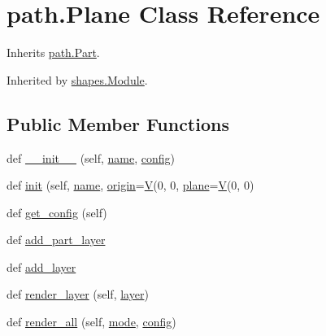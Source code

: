 \hypertarget{classpath_1_1_plane}{}\section{path.\+Plane Class Reference}
\label{classpath_1_1_plane}


Inherits \hyperlink{classpath_1_1_part}{path.\+Part}.



Inherited by \hyperlink{classshapes_1_1_module}{shapes.\+Module}.

\subsection*{Public Member Functions}
\begin{DoxyCompactItemize}
\item 
def \hyperlink{classpath_1_1_plane_a8c7b599791d3c3452ee585a386631e26}{\+\_\+\+\_\+init\+\_\+\+\_\+} (self, \hyperlink{classpath_1_1_plane_a83242faa5f70bd6aa867c977d4f4a6c1}{name}, \hyperlink{classpath_1_1_plane_a9c3565a0c72c585ffd3d9305d9e59b64}{config})
\item 
def \hyperlink{classpath_1_1_plane_adf18d22bc49d69c89b576a79fdba4db8}{init} (self, \hyperlink{classpath_1_1_plane_a83242faa5f70bd6aa867c977d4f4a6c1}{name}, \hyperlink{classpath_1_1_plane_a07fffbf7ef837b7f8a0d9e2a69161e1b}{origin}=\hyperlink{namespacepath_a1d2c06ebecd0a735e9c87e8b97ee9d1a}{V}(0, 0, \hyperlink{classpath_1_1_plane_aa10bd618cd80d3ee1fe348a94b173736}{plane}=\hyperlink{namespacepath_a1d2c06ebecd0a735e9c87e8b97ee9d1a}{V}(0, 0)
\item 
def \hyperlink{classpath_1_1_plane_addfb772498362a6c1fe70872f8a8eca8}{get\+\_\+config} (self)
\item 
def \hyperlink{classpath_1_1_plane_ae408776ac58181141026a5f5ca581668}{add\+\_\+part\+\_\+layer}
\item 
def \hyperlink{classpath_1_1_plane_a1c4c4deb3480dcb9fc421764e63dc253}{add\+\_\+layer}
\item 
def \hyperlink{classpath_1_1_plane_a5490de0bcdc4abcbb6d11824bd4dcfe1}{render\+\_\+layer} (self, \hyperlink{classpath_1_1_part_aa1d9912dfa1d7e3222df898d2a18786f}{layer})
\item 
def \hyperlink{classpath_1_1_plane_a8caaa3344bb41858e2b9fc64d58e0879}{render\+\_\+all} (self, \hyperlink{classpath_1_1_plane_acd9711469d21f4785a72a27794f625cf}{mode}, \hyperlink{classpath_1_1_plane_a9c3565a0c72c585ffd3d9305d9e59b64}{config})
\item 

\end{DoxyCompactItemize}

